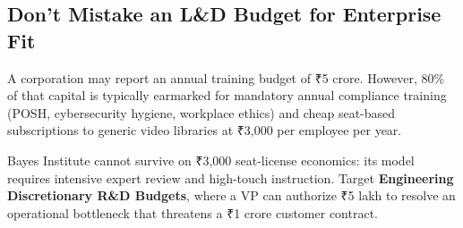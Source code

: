 \subsection{Don't Mistake an L\&D Budget for Enterprise Fit}

A corporation may report an annual training budget of ₹5 crore. However, 80\% of that capital is typically earmarked for mandatory annual compliance training (POSH, cybersecurity hygiene, workplace ethics) and cheap seat-based subscriptions to generic video libraries at ₹3,000 per employee per year.

Bayes Institute cannot survive on ₹3,000 seat-license economics: its model requires intensive expert review and high-touch instruction. Target \textbf{Engineering Discretionary R\&D Budgets}, where a VP can authorize ₹5 lakh to resolve an operational bottleneck that threatens a ₹1 crore customer contract.
